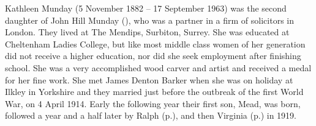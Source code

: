 
Kathleen Munday (5 November 1882 -- 17 September 1963) was the second daughter of John Hill Munday (), who was a partner in a firm of solicitors in London. They lived at The Mendips, Surbiton, Surrey. She was educated at Cheltenham Ladies College, but like most middle class women of her generation did not receive a higher education, nor did she seek employment after finishing school. She was a very accomplished wood carver and artist and received a medal for her fine work. She met James Denton Barker when she was on holiday at Ilkley in Yorkshire and they married just before the outbreak of the first World War, on 4 April 1914. Early the following year their first son, Mead, was born, followed a year and a half later by Ralph (p.\pageref{Ralph_Munday_Denton-Barker}), and then Virginia (p.\pageref{Virginia_Kathleen_Denton_Barker}) in 1919.
